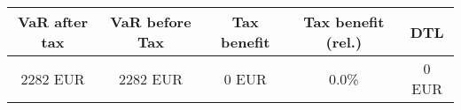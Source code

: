 \center
\label{table_port_var_tax}
\begin{tabular}{c|c|c|c|c}
VaR after tax & VaR before Tax & Tax benefit & Tax benefit (rel.) & DTL \\\hline
     2282 EUR &      2282 EUR &         0 EUR & 0.0\% &         0 EUR \\
\end{tabular}
